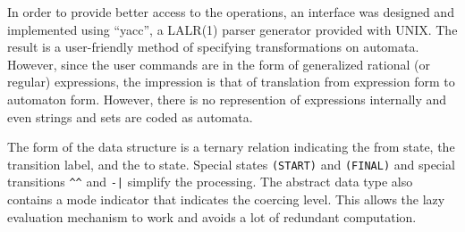 In order to provide better access to the operations, an interface was
designed and implemented using ``yacc'', a LALR(1) parser generator
provided with UNIX.
The result is a user-friendly method of specifying transformations on
automata.
However, since the user commands are in the form of generalized rational
(or regular) expressions, the impression is that of translation from
expression form to automaton form.
However, there is no represention of expressions internally and even
strings and sets are coded as automata.

The form of the data structure is a ternary relation indicating the from
state, the transition label, and the to state.
Special states \verb#(START)# and \verb#(FINAL)# and special transitions
\verb#^^# and \verb#-|# simplify the processing.
The abstract data type also contains a mode indicator that indicates the
coercing level.
This allows the lazy evaluation mechanism to work and avoids a lot of
redundant computation.

